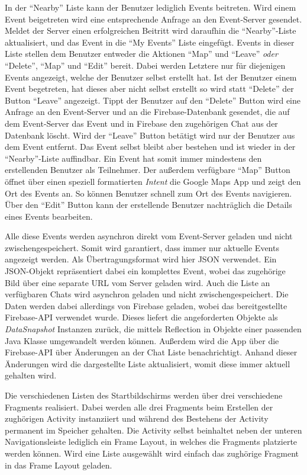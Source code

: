 \documentclass{scrartcl}
\begin{document}
In der \enquote{Nearby} Liste kann der Benutzer lediglich Events beitreten. Wird
einem Event beigetreten wird eine entsprechende Anfrage an den Event-Server
gesendet. Meldet der Server einen erfolgreichen Beitritt wird daraufhin die
\enquote{Nearby}-Liste aktualisiert, und das Event in die \enquote{My Events}
Liste eingefügt. Events in dieser Liste stellen dem Benutzer entweder die
Aktionen \enquote{Map} und \enquote{Leave} \emph{oder} \enquote{Delete},
\enquote{Map} und \enquote{Edit} bereit. Dabei werden Letztere nur für
diejenigen Events angezeigt, welche der Benutzer selbst erstellt hat. Ist der
Benutzer einem Event begetreten, hat dieses aber nicht selbst erstellt so wird
statt \enquote{Delete} der Button \enquote{Leave} angezeigt. Tippt der Benutzer
auf den \enquote{Delete} Button wird eine Anfrage an den Event-Server und an die
Firebase-Datenbank gesendet, die auf dem Event-Server das Event und in Firebase
den zugehörigen Chat aus der Datenbank löscht. Wird der \enquote{Leave} Button
betätigt wird nur der Benutzer aus dem Event entfernt. Das Event selbst bleibt
aber bestehen und ist wieder in der \enquote{Nearby}-Liste auffindbar. Ein Event
hat somit immer mindestens den erstellenden Benutzer als Teilnehmer. Der
außerdem verfügbare \enquote{Map} Button öffnet über einen speziell formatierten
\emph{Intent} die Google Maps App und zeigt den Ort des Events an. So können
Benutzer schnell zum Ort des Events navigieren. Über den \enquote{Edit} Button
kann der erstellende Benutzer nachträglich die Details eines Events bearbeiten.

Alle diese Events werden asynchron direkt vom Event-Server geladen und nicht
zwischengespeichert. Somit wird garantiert, dass immer nur aktuelle Events
angezeigt werden. Als Übertragungsformat wird hier JSON verwendet. Ein
JSON-Objekt repräsentiert dabei ein komplettes Event, wobei das zugehörige Bild
über eine separate URL vom Server geladen wird. Auch die Liste an verfügbaren
Chats wird asynchron geladen und nicht zwischengespeichert. Die Daten werden
dabei allerdings von Firebase geladen, wobei das bereitgestellte Firebase-API
verwendet wurde. Dieses liefert die angeforderten Objekte als
\emph{DataSnapshot} Instanzen zurück, die mittels Reflection in Objekte einer
passenden Java Klasse umgewandelt werden können. Außerdem wird die App über die
Firebase-API über Änderungen an der Chat Liste benachrichtigt. Anhand dieser
Änderungen wird die dargestellte Liste aktualisiert, womit diese immer aktuell
gehalten wird.

Die verschiedenen Listen des Startbildschirms werden über drei verschiedene
Fragments realisiert. Dabei werden alle drei Fragments beim Erstellen der
zughörigen Activity instanziiert und während des Bestehens der Activity
permanent im Speicher gehalten. Die Activity selbst beinhaltet neben der unteren
Navigationsleiste lediglich ein Frame Layout, in welches die Fragments
platzierte werden können. Wird eine Liste ausgewählt wird einfach das zughörige
Fragment in das Frame Layout geladen.
\end{document}
